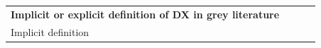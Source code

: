 \documentclass[english, 12pt, a4paper, sci, utf8, a-1b, online]{aaltothesis}
\begin{document}
{\begin{center}
\begin{longtable}{p{0.3\linewidth}p{0.6\linewidth}}
      \multicolumn{2}{l}{\textbf{Implicit or explicit definition of DX in grey literature}}                                                                                                                                                                                                                                                                                                                                                                                                                                                                                                                                                                                                                                                                                                                                                                                                                                                           \\*
      Implicit definition & \newline \textcite{great-dx-and-the-people-who-make-them} \newline \textcite{heroku-dx} \newline \textcite{api-developer-experience-dx-resources} \newline \textcite{developer-experience-sanity}                                                                                                                                                                                                                                                                                                                                                                                                                                                                                                                                                                                                                                                                                                                         \\

\end{longtable}
\end{center}}
\end{document}
